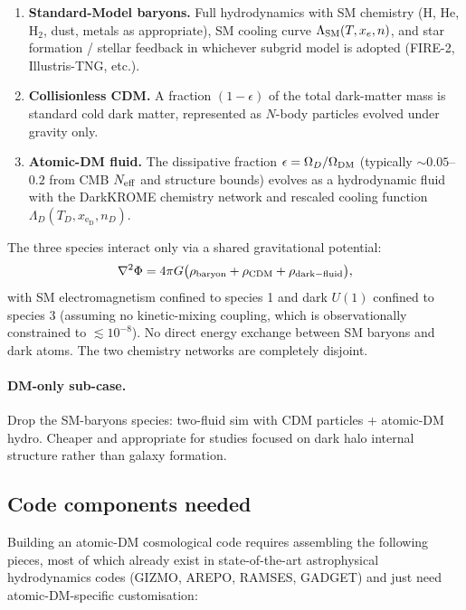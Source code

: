 \documentclass[12pt]{article}
\newcommand{\eD}{\mathrm{e_D}}
\begin{document}
\begin{enumerate}
  \item \textbf{Standard-Model baryons.}  Full hydrodynamics with SM
        chemistry (H, He, H$_2$, dust, metals as appropriate),
        SM cooling curve $\Lambda_{\rm SM}(T,x_e,n)$, and star
        formation / stellar feedback in whichever subgrid model is
        adopted (FIRE-2, Illustris-TNG, etc.).
  \item \textbf{Collisionless CDM.}  A fraction $(1-\epsilon)$ of the
        total dark-matter mass is standard cold dark matter,
        represented as $N$-body particles evolved under gravity only.
  \item \textbf{Atomic-DM fluid.}  The dissipative fraction
        $\epsilon = \Omega_D/\Omega_{\rm DM}$ (typically $\sim 0.05$--
        $0.2$ from CMB $N_{\rm eff}$ and structure bounds) evolves as
        a hydrodynamic fluid with the DarkKROME chemistry network and
        rescaled cooling function $\Lambda_D(T_D,x_{\eD},n_D)$.
\end{enumerate}
%
The three species interact only via a shared gravitational potential:
%
\begin{equation}
  \nabla^2\Phi = 4\pi G\bigl(
      \rho_{\rm baryon}
    + \rho_{\rm CDM}
    + \rho_{\rm dark-fluid}
    \bigr),
  \label{eq:combined_poisson}
\end{equation}
%
with SM electromagnetism confined to species 1 and dark $U(1)$
confined to species 3 (assuming no kinetic-mixing coupling, which is
observationally constrained to $\lesssim 10^{-8}$).  No direct
energy exchange between SM baryons and dark atoms.  The two chemistry
networks are completely disjoint.

\paragraph{DM-only sub-case.}  Drop the SM-baryons species: two-fluid
sim with CDM particles + atomic-DM hydro.  Cheaper and appropriate
for studies focused on dark halo internal structure rather than
galaxy formation.

\subsection{Code components needed}
\label{sec:code_components}

Building an atomic-DM cosmological code requires assembling the
following pieces, most of which already exist in state-of-the-art
astrophysical hydrodynamics codes (GIZMO, AREPO, RAMSES, GADGET) and
just need atomic-DM-specific customisation:
\end{document}
